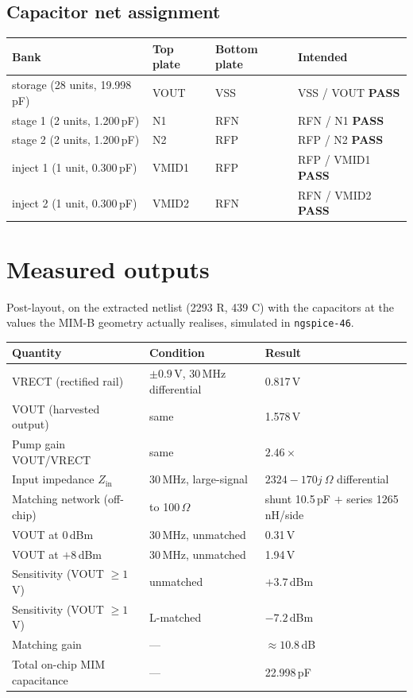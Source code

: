 \documentclass[11pt,a4paper]{article}
\newcommand{\PASS}{\textcolor{green!50!black}{\textbf{PASS}}}
\begin{document}
\subsection*{Capacitor net assignment}

\begin{center}
\begin{tabular}{@{}llll@{}}
\toprule
\textbf{Bank} & \textbf{Top plate} & \textbf{Bottom plate} & \textbf{Intended} \\
\midrule
storage (28 units, 19.998\,pF) & VOUT  & VSS & VSS / VOUT \quad\PASS \\
stage 1 (2 units, 1.200\,pF)   & N1    & RFN & RFN / N1 \quad\PASS \\
stage 2 (2 units, 1.200\,pF)   & N2    & RFP & RFP / N2 \quad\PASS \\
inject 1 (1 unit, 0.300\,pF)   & VMID1 & RFP & RFP / VMID1 \quad\PASS \\
inject 2 (1 unit, 0.300\,pF)   & VMID2 & RFN & RFN / VMID2 \quad\PASS \\
\bottomrule
\end{tabular}
\end{center}

\section{Measured outputs}

Post-layout, on the extracted netlist (2293 R, 439 C) with the capacitors at the values the
MIM-B geometry actually realises, simulated in \texttt{ngspice-46}.

\begin{center}
\begin{tabular}{@{}lll@{}}
\toprule
\textbf{Quantity} & \textbf{Condition} & \textbf{Result} \\
\midrule
VRECT (rectified rail) & $\pm0.9$\,V, 30\,MHz differential & 0.817\,V \\
VOUT (harvested output) & same & 1.578\,V \\
Pump gain VOUT/VRECT & same & $2.46\times$ \\
Input impedance $Z_\mathrm{in}$ & 30\,MHz, large-signal & $2324 - 170j\ \Omega$ differential \\
Matching network (off-chip) & to 100\,$\Omega$ & shunt 10.5\,pF $+$ series 1265\,nH/side \\
VOUT at 0\,dBm & 30\,MHz, unmatched & 0.31\,V \\
VOUT at $+8$\,dBm & 30\,MHz, unmatched & 1.94\,V \\
Sensitivity (VOUT $\geq 1$\,V) & unmatched & $+3.7$\,dBm \\
Sensitivity (VOUT $\geq 1$\,V) & L-matched & $-7.2$\,dBm \\
Matching gain & --- & $\approx 10.8$\,dB \\
Total on-chip MIM capacitance & --- & 22.998\,pF \\
\bottomrule
\end{tabular}
\end{center}
\end{document}
